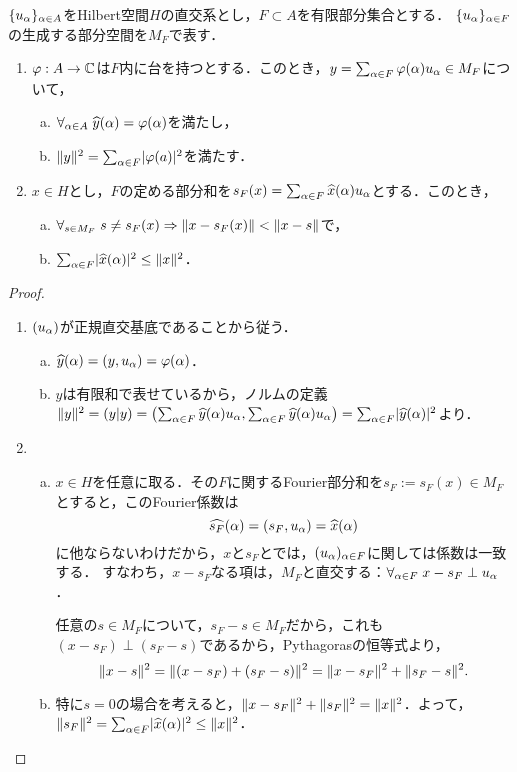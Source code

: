 \documentclass[uplatex,dvipdfmx]{jsreport}
\begin{document}
\begin{lemma}[有限な正規直交系についての観察]\label{lemma-finite-Fourier}
    $\{u_\alpha\}_{\alpha\in A}$をHilbert空間$H$の直交系とし，$F\subset A$を有限部分集合とする．
    $\{u_\alpha\}_{\alpha\in F}$の生成する部分空間を$M_F$で表す．
    \begin{enumerate}
        \item $\varphi:A\to\mathbb{C}$は$F$内に台を持つとする．このとき，$y=\sum_{\alpha\in F}\varphi(\alpha)u_\alpha\in M_F$について，
        \begin{enumerate}[(a)]
            \item $\forall_{\alpha\in A}\;\widehat{y}(\alpha)=\varphi(\alpha)$を満たし，
            \item $\|y\|^2=\sum_{\alpha\in F}\lvert\varphi(a)\rvert^2$を満たす．
        \end{enumerate}
        \item $x\in H$とし，$F$の定める部分和を$s_F(x)=\sum_{\alpha\in F}\widehat{x}(\alpha)u_\alpha$とする．このとき，
        \begin{enumerate}[(a)]
            \item $\forall_{s\in M_F}\;s\ne s_F(x)\Rightarrow\|x-s_F(x)\|<\|x-s\|$で，
            \item $\sum_{\alpha\in F}\lvert\widehat{x}(\alpha)\rvert^2\le\|x\|^2$．
        \end{enumerate}
    \end{enumerate}
\end{lemma}
\begin{proof}\mbox{}
    \begin{enumerate}
        \item $(u_\alpha)$が正規直交基底であることから従う．
        \begin{enumerate}[(a)]
            \item $\widehat{y}(\alpha)=(y,u_\alpha)=\varphi(\alpha)$．
            \item $y$は有限和で表せているから，ノルムの定義$\|y\|^2=(y|y)=\left(\sum_{\alpha\in F}\widehat{y}(\alpha)u_\alpha,\sum_{\alpha\in F}\widehat{y}(\alpha)u_\alpha\right)=\sum_{\alpha\in F}\lvert\widehat{y}(\alpha)\rvert^2$より．
        \end{enumerate}
        \item 
        \begin{enumerate}[(a)]
            \item $x\in H$を任意に取る．その$F$に関するFourier部分和を$s_F:=s_F(x)\in M_F$とすると，このFourier係数は
            \[\widehat{s_F}(\alpha)=(s_F,u_\alpha)=\widehat{x}(\alpha)\]
            に他ならないわけだから，$x$と$s_F$とでは，$(u_\alpha)_{\alpha\in F}$に関しては係数は一致する．
            すなわち，$x-s_F$なる項は，$M_F$と直交する：$\forall_{\alpha\in F}\;x-s_F\perp u_\alpha$．

            任意の$s\in M_F$について，$s_F-s\in M_F$だから，これも$(x-s_F)\perp(s_F-s)$であるから，Pythagorasの恒等式より，
            \[\|x-s\|^2=\|(x-s_F)+(s_F-s)\|^2=\|x-s_F\|^2+\|s_F-s\|^2.\]
            \item 特に$s=0$の場合を考えると，$\|x-s_F\|^2+\|s_F\|^2=\|x\|^2$．よって，$\|s_F\|^2=\sum_{\alpha\in F}\lvert\widehat{x}(\alpha)\rvert^2\le\|x\|^2$．
        \end{enumerate}
    \end{enumerate}
\end{proof}
\end{document}
